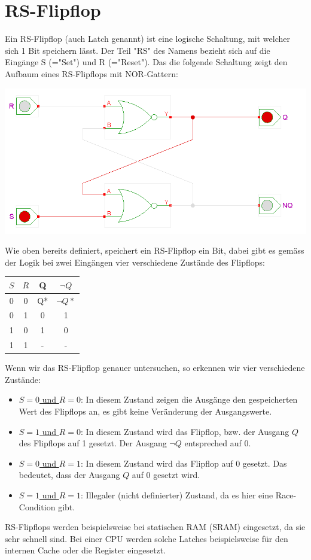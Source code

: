 \documentclass{report}
\begin{document}
\section{RS-Flipflop}
Ein RS-Flipflop (auch Latch genannt) ist eine logische Schaltung, mit welcher sich 1 Bit speichern lässt. Der Teil "RS" des Namens bezieht sich auf die Eingänge S (="Set") und R (="Reset"). Das die folgende Schaltung zeigt den Aufbaum eines RS-Flipflops mit NOR-Gattern:
\begin{center}\includegraphics[scale=0.25]{img/sr-flipflop.png}\end{center}
Wie oben bereits definiert, speichert ein RS-Flipflop ein Bit, dabei gibt es gemäss der Logik bei zwei Eingängen vier verschiedene Zustände des Flipflops:
\begin{center}\begin{tabular}{c c | c c}
$S$ & $R$ & Q & $\lnot Q$ \\ \hline
0 & 0 & Q* & $\lnot Q*$\\
0 & 1 & 0 & 1 \\
1 & 0 & 1 & 0 \\
1 & 1 & - & -\end{tabular}\end{center}
Wenn wir das RS-Flipflop genauer untersuchen, so erkennen wir vier verschiedene Zustände:
\begin{itemize}\item \underline{$S=0$ und $R=0$}: In diesem Zustand zeigen die Ausgänge den gespeicherten Wert des Flipflops an, es gibt keine Veränderung der Ausgangswerte.
\item \underline{$S=1$ und $R=0$}: In diesem Zustand wird das Flipflop, bzw. der Ausgang $Q$ des Flipflops auf 1 gesetzt. Der Ausgang $\lnot Q$ entspreched auf 0.
\item \underline{$S=0$ und $R=1$}: In diesem Zustand wird das Flipflop auf 0 gesetzt. Das bedeutet, dass der Ausgang $Q$ auf 0 gesetzt wird.
\item \underline{$S=1$ und $R=1$}: Illegaler (nicht definierter) Zustand, da es hier eine Race-Condition gibt. \end{itemize}
RS-Flipflops werden beispielsweise bei statischen RAM (SRAM) eingesetzt, da sie sehr schnell sind. Bei einer CPU werden solche Latches beispielsweise für den internen Cache oder die Register eingesetzt.
\end{document}
